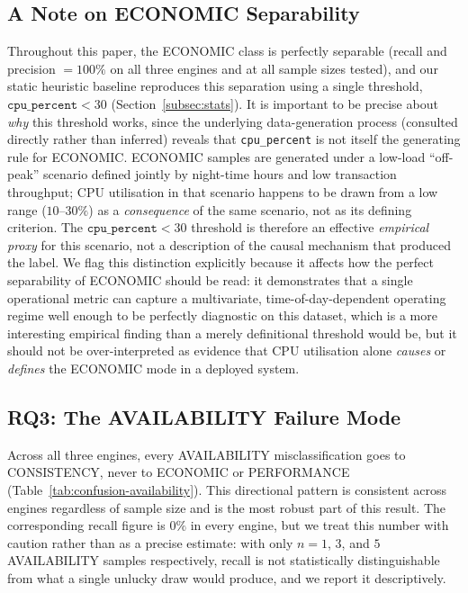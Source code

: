 \documentclass[iicol,pdflatex,sn-mathphys-num]{sn-jnl}
\theoremstyle{thmstyleone}
\theoremstyle{thmstylethree}
\begin{document}
\subsection{A Note on ECONOMIC Separability}\label{subsec:economic-note}

Throughout this paper, the ECONOMIC class is perfectly separable
(recall and precision $=100\%$ on all three engines and at all sample
sizes tested), and our static heuristic baseline reproduces this
separation using a single threshold, $\texttt{cpu\_percent} < 30$
(Section~\ref{subsec:stats}). It is important to be precise about
\emph{why} this threshold works, since the underlying data-generation
process (consulted directly rather than inferred) reveals that
\texttt{cpu\_percent} is not itself the generating rule for ECONOMIC.
ECONOMIC samples are generated under a low-load
``off-peak'' scenario defined jointly by night-time hours and low
transaction throughput; CPU utilisation in that scenario happens to be
drawn from a low range ($10$--$30\%$) as a \emph{consequence} of the
same scenario, not as its defining criterion. The
$\texttt{cpu\_percent}<30$ threshold is therefore an effective
\emph{empirical proxy} for this scenario, not a description of the
causal mechanism that produced the label. We flag this distinction
explicitly because it affects how the perfect separability of
ECONOMIC should be read: it demonstrates that a single operational
metric can capture a multivariate, time-of-day-dependent operating
regime well enough to be perfectly diagnostic on this dataset, which
is a more interesting empirical finding than a merely definitional
threshold would be, but it should not be over-interpreted as evidence
that CPU utilisation alone \emph{causes} or \emph{defines} the
ECONOMIC mode in a deployed system.

\subsection{RQ3: The AVAILABILITY Failure Mode}\label{subsec:rq3}

Across all three engines, every AVAILABILITY misclassification goes to
CONSISTENCY, never to ECONOMIC or PERFORMANCE
(Table~\ref{tab:confusion-availability}). This directional pattern is
consistent across engines regardless of sample size and is the most
robust part of this result. The corresponding recall figure is $0\%$
in every engine, but we treat this number with caution rather than as
a precise estimate: with only $n=1$, $3$, and $5$ AVAILABILITY samples
respectively, recall is not statistically distinguishable from what a
single unlucky draw would produce, and we report it descriptively.
\end{document}
